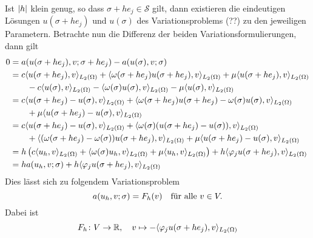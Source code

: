 \begin{Satz}
\begin{Beweis}
        Ist $\abs{h}$ klein genug, so dass $\sigma + h e_{j} \in \mathcal S$ gilt, dann existieren die eindeutigen Lösungen $u(\sigma + h e_{j})$ und $u(\sigma)$ des Variationsproblems (??) zu den jeweiligen Parametern.
        Betrachte nun die Differenz der beiden Variationsformulierungen, dann gilt
        \begin{align}
            0 &= a(u(\sigma + h e_{j}), v; \sigma + h e_{j}) - a(u(\sigma), v; \sigma)
            \\ &= c \skp{u(\sigma + h e_{j})}{v}{L_{2}(\Omega)} + \skp{\omega(\sigma + h e_{j}) u(\sigma + h e_{j})}{v}{L_{2}(\Omega)} + \mu \skp{u(\sigma + h e_{j})}{v}{L_{2}(\Omega)}
            \\&\qquad - c \skp{u(\sigma)}{v}{L_{2}(\Omega)} - \skp{\omega(\sigma) u(\sigma)}{v}{L_{2}(\Omega)} - \mu \skp{u(\sigma)}{v}{L_{2}(\Omega)}
            \\&= c \skp{u(\sigma + h e_{j}) - u(\sigma)}{v}{L_{2}(\Omega)} + \skp{\omega(\sigma + h e_{j}) u(\sigma + h e_{j}) - \omega(\sigma) u(\sigma)}{v}{L_{2}(\Omega)}
            \\&\qquad  + \mu \skp{u(\sigma + h e_{j}) - u(\sigma)}{v}{L_{2}(\Omega)}
            \\&= c \skp{u(\sigma + h e_{j}) - u(\sigma)}{v}{L_{2}(\Omega)} + \skp{\omega(\sigma) (u(\sigma + h e_{j}) - u(\sigma))}{v}{L_{2}(\Omega)}
            \\&\qquad + \skp{(\omega(\sigma + h e_{j}) - \omega(\sigma)) u(\sigma + h e_{j})}{v}{L_{2}(\Omega)} + \mu \skp{u(\sigma + h e_{j}) - u(\sigma)}{v}{L_{2}(\Omega)}
            \\&= h \left(
                c \skp{u_{h}}{v}{L_{2}(\Omega)} + \skp{\omega(\sigma) u_{h}}{v}{L_{2}(\Omega)} + \mu \skp{u_{h}}{v}{L_{2}(\Omega)}
             \right) + h \skp{\varphi_{j} u(\sigma + h e_{j})}{v}{L_{2}(\Omega)}
            \\&= h a(u_{h}, v; \sigma) + h \skp{\varphi_{j} u(\sigma + h e_{j})}{v}{L_{2}(\Omega)}
        \end{align}
        Dies lässt sich zu folgendem Variationsproblem
        \begin{equation}
            a(u_{h}, v; \sigma) = F_{h}(v) \quad \fa v \in V.
        \end{equation}
        Dabei ist
        \begin{equation}
            F_{h} \colon V \to \mathbb{R}, \quad v \mapsto - \skp{\varphi_{j} u(\sigma + h e_{j})}{v}{L_{2}(\Omega)}

\end{equation}
\end{Beweis}
\end{Satz}
